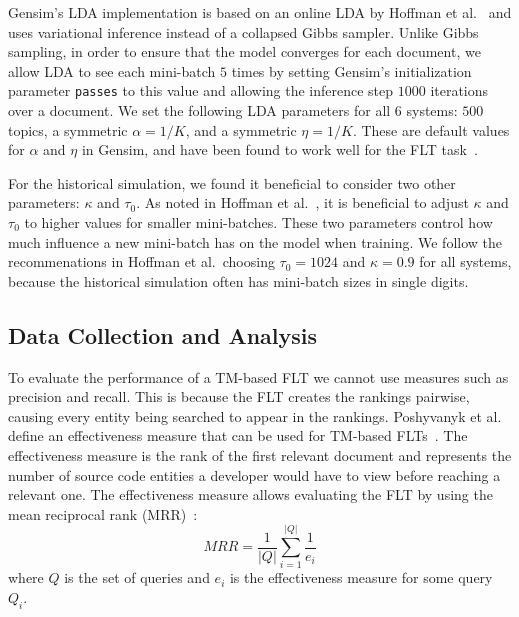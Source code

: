 Gensim's LDA implementation is based on an online LDA by Hoffman et
al.~\cite{Hoffman-etal_2010} and uses variational inference instead of a
collapsed Gibbs sampler.  Unlike Gibbs sampling, in order to ensure that the
model converges for each document, we allow LDA to see each mini-batch $5$ times
by setting Gensim's initialization parameter \texttt{passes} to this value and
allowing the inference step $1000$ iterations over a document.  We set the
following LDA parameters for all 6 systems: $500$ topics, a symmetric
$\alpha=1/K$, and a symmetric $\eta=1/K$.  These are default values for $\alpha$
and $\eta$ in Gensim, and have been found to work well for the FLT
task~\cite{Biggers-etal_2014}.

For the historical simulation, we found it beneficial to consider two other
parameters: $\kappa$ and $\tau_0$.  As noted in Hoffman et
al.~\cite{Hoffman-etal_2010}, it is beneficial to adjust $\kappa$ and $\tau_0$
to higher values for smaller mini-batches.  These two parameters control how
much influence a new mini-batch has on the model when training.  We follow the
recommenations in Hoffman et al.\, choosing $\tau_0=1024$ and $\kappa=0.9$ for
all systems, because the historical simulation often has mini-batch sizes in
single digits.




\subsection{Data Collection and Analysis}
\label{sec:data}

To evaluate the performance of a TM-based FLT we cannot use measures such as
precision and recall.  This is because the FLT creates the rankings pairwise,
causing every entity being searched to appear in the rankings.  Poshyvanyk et
al. define an effectiveness measure that can be used for TM-based
FLTs~\cite{Poshyvanyk-etal_2007}.  The effectiveness measure is the rank of the
first relevant document and represents the number of source code entities a
developer would have to view before reaching a relevant one.  The effectiveness
measure allows evaluating the FLT by using the mean reciprocal rank
(MRR)~\cite{Voorhees_1999}:
\begin{equation}
    MRR = \frac{1}{|Q|} \sum_{i=1}^{|Q|} \frac{1}{e_i}
\end{equation}
where $Q$ is the set of queries and $e_i$ is the effectiveness measure for some
query $Q_i$.

